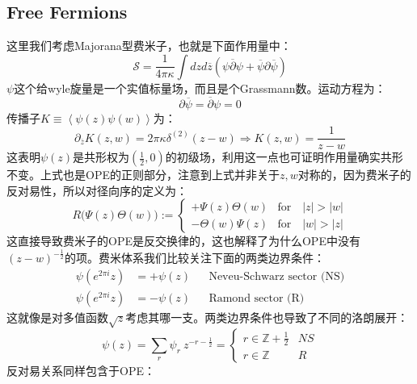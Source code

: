 \subsection{Free Fermions}
这里我们考虑Majorana型费米子，也就是下面作用量中：
\begin{equation}
	\mathcal{S}=\frac1{4\pi\kappa}\int dzd\overline{z}\left(\psi\overline{\partial}\psi+\overline{\psi}\partial\overline{\psi}\right)
\end{equation}
$\psi$这个给wyle旋量是一个实值标量场，而且是个Grassmann数。运动方程为：
\begin{equation}
	\partial\overline{\psi}=\overline{\partial}\psi=0
\end{equation}
传播子$K\equiv\left\langle\psi(z)\psi(w)\right\rangle$为：
\begin{equation}
	\partial_{\overline{z}}K(z,w)=2\pi\kappa\delta^{(2)}(z-w)\Rightarrow K(z,w)=\frac{1}{z-w}
\end{equation}
这表明$\psi(z)$是共形权为$(\frac{1}{2},0)$的初级场，利用这一点也可证明作用量确实共形不变。上式也是OPE的正则部分，注意到上式并非关于$z,w$对称的，因为费米子的反对易性，所以对径向序的定义为：
\begin{equation}
	R\big(\Psi(z)\Theta(w)\big):=
	\begin{cases}+\Psi(z)\Theta(w)&\mathrm{for}\quad|z|>|w|\\-\Theta(w)\Psi(z)&\mathrm{for}\quad|w|>|z|\end{cases}
\end{equation}
这直接导致费米子的OPE是反交换律的，这也解释了为什么OPE中没有$(z-w)^{-\frac{1}{2}}$的项。费米体系我们比较关注下面的两类边界条件：
\begin{equation}
	\begin{aligned}\psi(e^{2\pi i}z)&=+\psi(z)&&\text{Neveu-Schwarz sector (NS)}\\\psi(e^{2\pi i}z)&=-\psi(z)&&\text{Ramond sector (R)}\end{aligned}
\end{equation}
这就像是对多值函数$\sqrt{z}$考虑其哪一支。两类边界条件也导致了不同的洛朗展开：
\begin{equation}
	\psi(z)=\sum_r\psi_r\mathrm{~}z^{-r-\frac12}=\begin{cases}r\in\mathbb{Z}+\frac1{2}&NS\\r\in\mathbb{Z}&R\end{cases}
\end{equation}
反对易关系同样包含于OPE：
